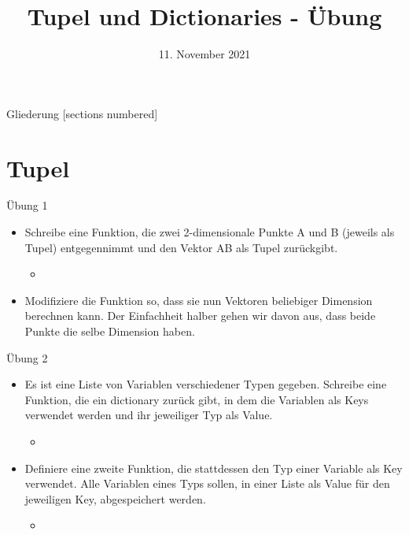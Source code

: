 



\title{Tupel und Dictionaries - Übung}
\date{11. November 2021}


\maketitle

\begin{frame}{Gliederung}
	[sections numbered]
	\tableofcontents
\end{frame}


\section{Tupel}

\begin{frame}{Übung 1}
	\begin{itemize}
		\item[\textbf{1.}] Schreibe eine Funktion, die zwei 2-dimensionale Punkte A und B (jeweils als Tupel) entgegennimmt und den Vektor AB als Tupel zurückgibt.
		\begin{itemize}
			\item[\textbf{Bsp.:}]
		\end{itemize}
		\item[\textbf{2.}] Modifiziere die Funktion so, dass sie nun Vektoren beliebiger Dimension berechnen kann. Der Einfachheit halber gehen wir davon aus, dass beide Punkte die selbe Dimension haben.
	\end{itemize}
\end{frame}

\begin{frame}{Übung 2}
	\begin{itemize}
		\item[\textbf{1.}] Es ist eine Liste von Variablen verschiedener Typen gegeben. Schreibe eine Funktion, die ein dictionary zurück gibt, in dem die Variablen als Keys verwendet werden und ihr jeweiliger Typ als Value.
		\begin{itemize}
			\item[\textbf{Bsp.:}] 
		\end{itemize}
		\item[\textbf{2.}] Definiere eine zweite Funktion, die stattdessen den Typ einer Variable als Key verwendet. Alle Variablen eines Typs sollen, in einer Liste als Value für den jeweiligen Key, abgespeichert werden.
		\begin{itemize}
			\item[\textbf{Bsp.:}]
		\end{itemize}
		\end{itemize}
\end{frame}

